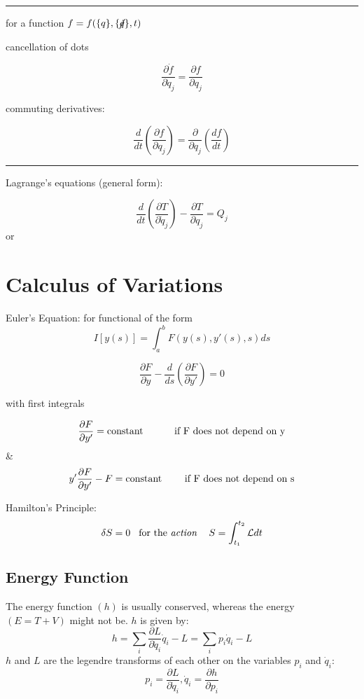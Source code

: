 \documentclass[table,cmyk]{article}
\newcommand{\Lagr}{\mathcal{L}}
\begin{document}
\begin{longtable}
\noindent\rule{7.8cm}{0.4pt}

for a function $f = f(\{q\},\{\cancel{\dot{q}}\},t)$

cancellation of dots

\[ \frac{\partial \dot{f}}{\partial \dot{q}_j} = \frac{\partial f}{\partial q_j}\]

commuting derivatives:

\[\frac{d}{dt}\left(\frac{\partial f}{\partial q_j} \right) = \frac{\partial}{\partial q_j}\left( \frac{df}{dt} \right)\]

\noindent\rule{7.8cm}{0.4pt}

Lagrange's equations (general form):

\[ \frac{d}{dt} \left( \frac{\partial T}{\partial \dot{q}_j} \right) - \frac{\partial T}{\partial q_j} = Q_j\]
or

\vspace{0.1cm}
\fbox{
\begin{minipage}{7.4cm}

\[\frac{d}{dt} \left( \frac{\partial \Lagr}{\partial q_j} \right) - \frac{\partial \Lagr}{\partial q_j} = 0\]

where $\Lagr(\{q\},\{\dot{q}\}.t) = T(\{q\}.\{\dot{q}\},t) - V(\{q\},t)$
\end{minipage}

}

\section*{Calculus of Variations}
Euler's Equation: for functional of the form
\[ I[y(s)] = \int_{a}^{b} F(y(s),y'(s),s)ds\]

\[ \frac{\partial F}{\partial y} - \frac{d}{ds} \left( \frac{\partial F}{\partial y'} \right) = 0 \]

with first integrals

\[\frac{\partial F}{\partial y'} = \text{constant} \text{\hspace{1cm} if F does not depend on y}\]
&
\[y'\frac{\partial F}{\partial y'} - F = \text{constant} \text{\hspace{0.7cm} if F does not depend on s}\]


Hamilton's Principle:
\[\delta S = 0 \text{\hspace{0.3cm}for the \textit{action} \hspace{0.3cm}} S = \int_{t_1}^{t_2} \Lagr dt \]
\subsection*{Energy Function}
  The energy function $(h)$ is usually conserved, whereas the energy $(E=T+V)$
  might not be. $h$ is given by:
  \begin{displaymath}
    h=\sum_i\frac{\partial L}{\partial \dot q_i}\dot q_i-L=\sum_ip_i\dot q_i-L
  \end{displaymath}
  $h$ and $L$ are the legendre transforms of each other on the variables $p_i$
  and $\dot q_i$:
  \begin{displaymath}
    p_i=\frac{\partial L}{\partial \dot q_i}, \dot q_i = \frac{\partial
      h}{\partial p_i}
  \end{displaymath}

\end{longtable}
\end{document}
